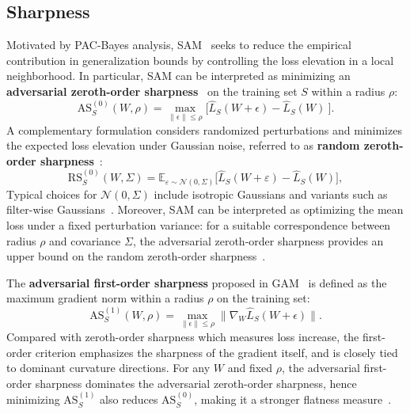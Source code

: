 \documentclass{article}
\theoremstyle{plain}
\theoremstyle{definition}
\theoremstyle{remark}
\begin{document}
\subsection{Sharpness}
\label{section:sahrpness}
Motivated by PAC-Bayes analysis, SAM~\citep{foretSharpnessAwareMinimizationEfficiently2021} seeks to reduce the empirical contribution in generalization bounds by controlling the loss elevation in a local neighborhood. In particular, SAM can be interpreted as minimizing an \textbf{adversarial zeroth-order sharpness}~\citep{AWP2020,foretSharpnessAwareMinimizationEfficiently2021} on the training set $S$ within a radius $\rho$:
{%
\[\mathrm{AS}^{(0)}_S(W,\rho) =\max_{ \| \epsilon \|\leq \rho } \Big[ \hat{L}_{S}(W+{\epsilon})-\hat{L}_{S}(W)\ \Big].\]
}
A complementary formulation considers randomized perturbations and minimizes the expected loss elevation under Gaussian noise, referred to as \textbf{random zeroth-order sharpness}~\citep{liRevisitingRandomWeight2024,jiang2019fantasticgeneralizationmeasures}:
{%
\[
\mathrm{RS}_S^{(0)}({W}, \Sigma)
 =
 \mathbb{E}_{\varepsilon \sim \mathcal{N}(0,\Sigma)}
 \big[
 \hat{L}_{S}({W}+\varepsilon) - \hat{L}_{S}({W})
 \big],
 \]}Typical choices for $\mathcal{N}(0,\Sigma)$ include isotropic Gaussians and variants such as filter-wise Gaussians~\citep{pmlr-v151-bisla22a}. Moreover, SAM can be interpreted as optimizing the mean loss under a fixed perturbation variance: for a suitable correspondence between radius $\rho$ and covariance $\Sigma$, 
 the adversarial zeroth-order sharpness provides an upper bound on the random zeroth-order sharpness~\cite{mollenhoffSAMOptimalRelaxation2022}.

The \textbf{adversarial first-order sharpness} proposed in GAM~\citep{Zhang_GAM} is defined as the maximum gradient norm within a radius $\rho$ on the training set:
{%
\[\mathrm{AS}^{(1)}_S(W,\rho) = \max_{ \| \epsilon \|\leq \rho } \| \nabla_{W} \hat{L}_S(W+\epsilon)\|.\]}Compared with zeroth-order sharpness which measures  loss increase, the first-order criterion emphasizes the sharpness of the gradient itself, and is closely tied to dominant curvature directions. For any $W$ and fixed $\rho$, the adversarial first-order sharpness dominates the adversarial zeroth-order sharpness, hence minimizing $\mathrm{AS}^{(1)}_S$ also reduces $\mathrm{AS}^{(0)}_S$, making it a stronger flatness measure~\citep{Zhang_GAM}.
\end{document}
